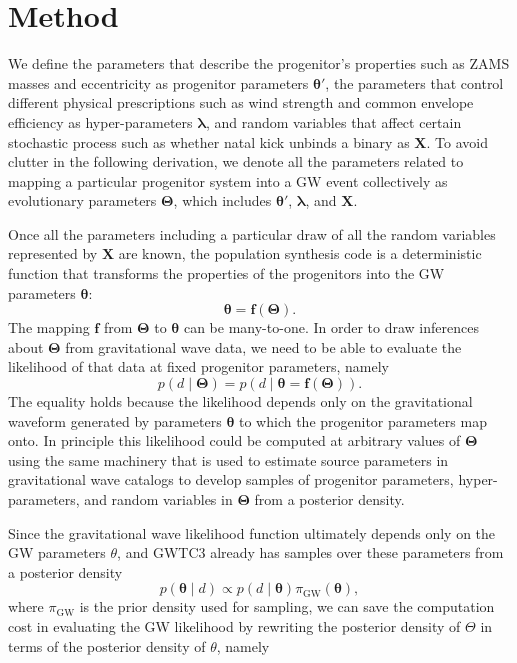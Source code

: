 \documentclass[twocolumn]{aastex631}
\begin{document}
\section{Method}
\label{sec:method}

We define the parameters that describe the progenitor's properties such as ZAMS
masses and eccentricity as progenitor parameters $\bm{\theta'}$, the parameters
that control different physical prescriptions such as wind strength and common
envelope efficiency as hyper-parameters $\bm{\lambda}$, and random variables
that affect certain stochastic process such as whether natal kick unbinds a
binary as $\bm{X}$. To avoid clutter in the following derivation, we denote all
the parameters related to mapping a particular progenitor system into a GW event
collectively as evolutionary parameters $\bm{\Theta}$, which includes
$\bm{\theta'}$, $\bm{\lambda}$, and $\bm{X}$.

Once all the parameters including a particular draw of all the random variables
represented by $\bm{X}$ are known, the population synthesis code is a
deterministic function that transforms the properties of the progenitors into
the GW parameters $\bm{\theta}$:
\begin{equation}
    \bm{\theta} = \bm{f}\left( \bm{\Theta} \right).
\end{equation}
The mapping $\bm{f}$ from $\bm{\Theta}$ to $\bm{\theta}$ can be many-to-one.  
In order to draw inferences about $\bm{\Theta}$ from gravitational wave data, we
need to be able to evaluate the likelihood of that data at fixed progenitor
parameters, namely
\begin{equation}
    p\left( d \mid \bm{\Theta} \right) = p\left( d \mid \bm{\theta} = \bm{f}\left( \bm{\Theta} \right) \right).
\end{equation}
The equality holds because the likelihood depends only on the gravitational waveform generated by
parameters $\bm{\theta}$ to which the progenitor parameters map onto.  In principle
this likelihood could be computed at arbitrary values of $\bm{\Theta}$ using the
same machinery that is used to estimate source parameters in gravitational wave
catalogs \citep{Veitch2015,Ashton2019,Romero-Shaw2020,GWTC-3} to develop samples
of progenitor parameters, hyper-parameters, and random variables in
$\bm{\Theta}$ from a posterior density.

Since the gravitational wave likelihood function
ultimately depends only on the GW parameters $\theta$, and GWTC3 already has samples over these parameters from a posterior density 
\begin{equation}
    p\left( \bm{\theta} \mid d \right) \propto p\left( d \mid \bm{\theta} \right) \pi_\mathrm{GW} \left( \bm{\theta} \right),
\end{equation}
where $\pi_\mathrm{GW}$ is the prior density used for sampling,
we can save the computation cost in evaluating the GW likelihood by rewriting the posterior density of $\Theta$ in terms of the posterior density of $\theta$, namely
\end{document}
